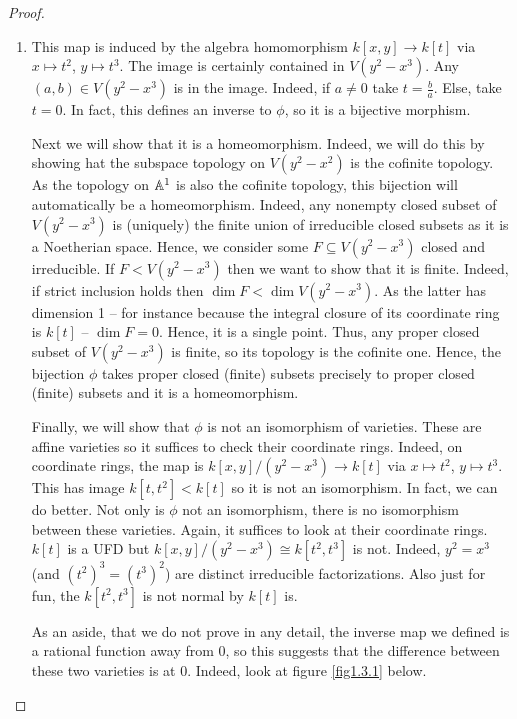 \begin{proof}
    \begin{enumerate}[label = (\alph*)]
        \item This map is induced by the algebra homomorphism $k[x, y] \longrightarrow k[t]$ via $x \mapsto t^2$, $y \mapsto t^3$. The image is certainly contained in $V(y^2 - x^3)$. Any $(a, b) \in V(y^2 - x^3)$ is in the image. Indeed, if $a \neq 0$ take $t = \frac{b}{a}$. Else, take $t = 0$. In fact, this defines an inverse to $\phi$, so it is a bijective morphism.

        Next we will show that it is a homeomorphism. Indeed, we will do this by showing hat the subspace topology on $V(y^2 - x^2)$ is the cofinite topology. As the topology on $\mathbb A^1$ is also the cofinite topology, this bijection will automatically be a homeomorphism. Indeed, any nonempty closed subset of $V(y^2 - x^3)$ is (uniquely) the finite union of irreducible closed subsets as it is a Noetherian space. Hence, we consider some $F \subseteq V(y^2 - x^3)$ closed and irreducible. If $F < V(y^2 - x^3)$ then we want to show that it is finite. Indeed, if strict inclusion holds then $\dim F < \dim V(y^2 - x^3)$. As the latter has dimension 1 -- for instance because the integral closure of its coordinate ring is $k[t]$ -- $\dim F = 0$. Hence, it is a single point. Thus, any proper closed subset of $V(y^2 - x^3)$ is finite, so its topology is the cofinite one. Hence, the bijection $\phi$ takes proper closed (finite) subsets precisely to proper closed (finite) subsets and it is a homeomorphism.

        Finally, we will show that $\phi$ is not an isomorphism of varieties. These are affine varieties so it suffices to check their coordinate rings. Indeed, on coordinate rings, the map is $k[x, y]/(y^2 - x^3) \longrightarrow k[t]$ via $x \mapsto t^2$, $y \mapsto t^3$. This has image $k[t, t^2] < k[t]$ so it is not an isomorphism. In fact, we can do better. Not only is $\phi$ not an isomorphism, there is no isomorphism between these varieties. Again, it suffices to look at their coordinate rings. $k[t]$ is a UFD but $k[x, y]/(y^2 - x^3) \cong k[t^2, t^3]$ is not. Indeed, $y^2 = x^3$ (and $(t^2)^3 = (t^3)^2$) are distinct irreducible factorizations. Also just for fun, the $k[t^2, t^3]$ is not normal by $k[t]$ is.

        As an aside, that we do not prove in any detail, the inverse map we defined is a rational function away from 0, so this suggests that the difference between these two varieties is at 0. Indeed, look at figure \ref{fig1.3.1} below.


\end{enumerate}
\end{proof}
